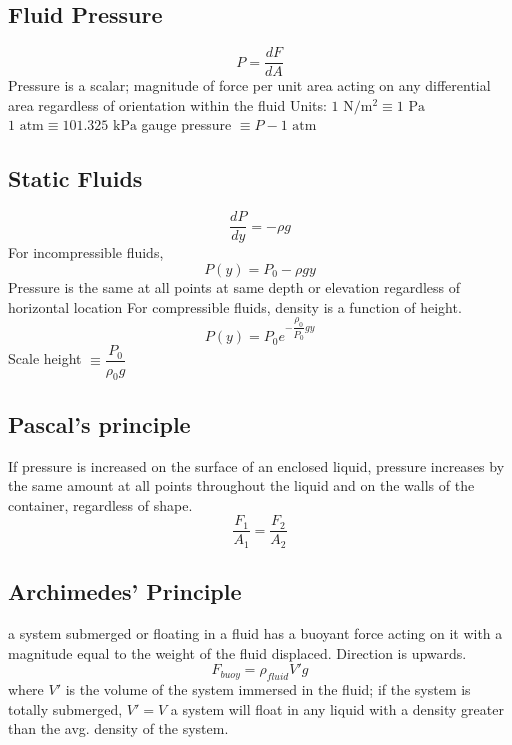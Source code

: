\documentclass[twocolumn]{article}
\begin{document}
\subsection{Fluid Pressure}
\begin{outline}
    \1 \[P=\dfrac{dF}{dA}\]
    \1 Pressure is a scalar; magnitude of force per unit area acting on any differential area regardless of orientation within the fluid
    \1 Units: $1\text{ N}/\text{m}^2\equiv1\text{ Pa}$
        \2 $1\text{ atm}\equiv101.325\text{ kPa}$
    \1 gauge pressure $\equiv P-1\text{ atm}$
\end{outline}
\subsection{Static Fluids}
\begin{outline}
\0 \[\dfrac{dP}{dy}=-\rho g\]
    \1 For incompressible fluids, \[P(y)=P_0-\rho gy\]
    \1 Pressure is the same  at all points at same depth or elevation regardless of horizontal location
    \1 For compressible fluids, density is a function of height.
\0 \[P(y)=P_0e^{-\dfrac{\rho_0}{P_0}gy}\]
    \1 Scale height $\equiv\dfrac{P_0}{\rho_0g}$
\end{outline}
\subsection{Pascal's principle}
\begin{outline}
    \1 If pressure is increased on the surface of an enclosed liquid, pressure increases by the same amount at all points throughout the liquid and on the walls of the container, regardless of shape. 
\0 \[\dfrac{F_1}{A_1}=\dfrac{F_2}{A_2}\]
\end{outline}
\subsection{Archimedes' Principle}
\begin{outline}
    \1 a system submerged or floating in a fluid has a buoyant force acting on it with a magnitude equal to the weight of the fluid displaced. Direction is upwards. \[F_{buoy}=\rho_{fluid}V'g\]
    \1 where $V'$ is the volume of the system immersed in the fluid; if the system is totally submerged, $V'=V$
    \1 a system will float in any liquid with a density greater than the avg. density of the system.
\end{outline}
\end{document}
